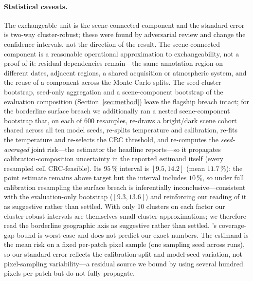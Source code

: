 \documentclass[preprint,3p,times]{elsarticle}
\begin{document}
\paragraph{Statistical caveats.} The exchangeable unit is the scene-connected component and the standard error is two-way cluster-robust; these were found by adversarial review and change the confidence intervals, not the direction of the result. The scene-connected component is a reasonable operational approximation to exchangeability, not a proof of it: residual dependencies remain---the same annotation region on different dates, adjacent regions, a shared acquisition or atmospheric system, and the reuse of a component across the Monte-Carlo splits. The seed-cluster bootstrap, seed-only aggregation and a scene-component bootstrap of the evaluation composition (Section~\ref{sec:method}) leave the flagship breach intact; for the borderline surface breach we additionally ran a nested scene-component bootstrap that, on each of $600$ resamples, re-draws a bright/dark scene cohort shared across all ten model seeds, re-splits temperature and calibration, re-fits the temperature and re-selects the CRC threshold, and re-computes the \emph{seed-averaged} joint risk---the estimator the headline reports---so it propagates calibration-composition uncertainty in the reported estimand itself (every resampled cell CRC-feasible). Its $95\,\%$ interval is $[9.5, 14.2]$ (mean $11.7\,\%$): the point estimate remains above target but the interval includes $10\,\%$, so under full calibration resampling the surface breach is inferentially inconclusive---consistent with the evaluation-only bootstrap ($[9.3, 13.6]$) and reinforcing our reading of it as suggestive rather than settled. With only 10 clusters on each factor our cluster-robust intervals are themselves small-cluster approximations; we therefore read the borderline geographic axis as suggestive rather than settled. \citet{barber2023}'s coverage-gap bound is worst-case and does not predict our exact numbers. The estimand is the mean risk on a fixed per-patch pixel sample (one sampling seed across runs), so our standard error reflects the calibration-split and model-seed variation, not pixel-sampling variability---a residual source we bound by using several hundred pixels per patch but do not fully propagate.
\end{document}
